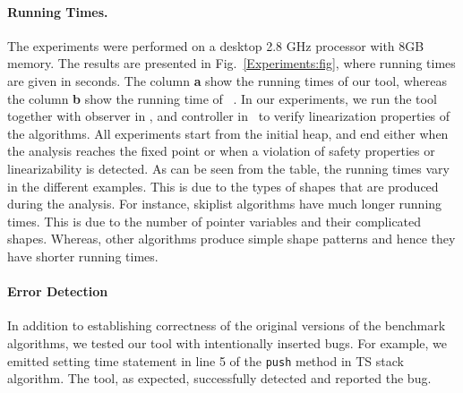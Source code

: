 \paragraph{Running Times.}The experiments were performed on a desktop 2.8 GHz processor with 8GB memory. The results are presented in Fig.~\ref{Experiments:fig}, where running times are given in seconds. The column \textbf{a} show the running times of our tool, whereas the column \textbf{b} show the running time of ~\cite{Quy:sas16}.  In our experiments, we run the tool together with observer in \cite{AHHR:integrated:rep}, \cite{BEEH:icalp15} and controller in~\cite{Quy:sas16} to verify linearization properties of the algorithms. All experiments start from the initial heap,  
and end either when the analysis reaches the fixed point or when a violation of safety properties or linearizability is detected. As can be seen from the table, the running times vary in the different examples. This is due to the types of shapes that are produced during the analysis. For instance, skiplist algorithms have much longer running times. This is due to the number of pointer variables and their complicated shapes. Whereas, other algorithms 
produce simple shape patterns and hence they have shorter running times.
\paragraph{Error Detection}
 In addition to establishing correctness of the original versions of the
benchmark algorithms, we tested our tool with intentionally inserted bugs. For example, we emitted setting time statement in line 5 of the {\tt push} method in TS stack algorithm. The tool, as expected, successfully detected and reported the bug.
 

%




